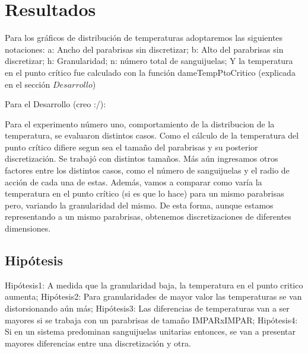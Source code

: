 \documentclass[a4paper]{article}
\begin{document}
\section{Resultados}


Para los gráficos de distribución de temperaturas adoptaremos las siguientes notaciones:\newline
a: Ancho del parabrisas sin discretizar; \newline
b: Alto del parabrisas sin discretizar; \newline
h: Granularidad;\newline
n: número total de sanguijuelas;\newline
Y la temperatura en el punto crítico fue calculado con la función dameTempPtoCritico (explicada en el sección $Desarrollo$)\newline

Para el Desarrollo (creo :/):\newline

Para el experimento número uno, comportamiento de la distribucion de la temperatura, se evaluaron distintos casos. Como el cálculo de la temperatura del punto crítico difiere segun sea el tamaño del parabrisas y su posterior discretización. Se trabajó con distintos tamaños. Más aún ingresamos otros factores entre los distintos casos, como el número de sanguijuelas y  el radio de acción de cada una de estas. Además, vamos a comparar como varía la temperatura en el punto crítico (si es que lo hace) para un mismo parabrisas pero, variando la granularidad del mismo. De esta forma, aunque estamos representando a un mismo parabrisas, obtenemos discretizaciones de diferentes dimensiones.        

\subsection{Hipótesis}

Hipótesis1: A medida que la granularidad baja, la temperatura en el punto critico aumenta;\newline
Hipótesis2: Para granularidades de mayor valor las temperaturas se van distorsionando aún más;\newline
Hipótesis3: Las diferencias de temperaturas van a ser mayores si se trabaja con un parabrisas de tamaño IMPARxIMPAR;\newline
Hipótesis4: Si en un sistema predominan sanguijuelas unitarias entonces, se van a presentar mayores diferencias entre una discretización y otra.\newline
\end{document}
